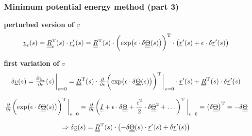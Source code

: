 \begin{frame}
  \frametitle{Minimum potential energy method (part 3)}
  
  \textbf{perturbed version of $\underline{v}$}
  \begin{displaymath}
    \underline{v}_{\epsilon}(s) =
    \underline{\underline{R}}_{\epsilon}^{\mathrm{T}}(s) \cdot \underline{r}_{\epsilon}^{\prime}(s) =
    \underline{\underline{R}}^{\mathrm{T}}(s) \cdot \biggl( \exp \bigl( \epsilon \cdot \delta \underline{\underline{\Theta}}(s) \bigr) \biggr)^{\mathrm{T}} \cdot \bigl( \underline{r}^{\prime}(s) + \epsilon \cdot \delta \underline{r}^{\prime}(s) \bigr)
  \end{displaymath}
  
  \vspace{0.5em}
  \textbf{first variation of $\underline{v}$}
  \begin{displaymath}
    \delta \underline{v}(s) = 
    \pd{\underline{v}_{\epsilon}}{\epsilon}(s) \sVert[3]_{\epsilon=0} =
    \doubleunderline{R}^{\mathrm{T}}(s) \cdot
    \pd{}{\epsilon} \biggl( \exp \bigl( \epsilon \cdot \delta \doubleunderline{\Theta}(s) \bigr) \biggr)^{\mathrm{T}} \sVert[3]_{\epsilon=0}
     \cdot \underline{r}^{\prime}(s) +
     \doubleunderline{R}^{\mathrm{T}}(s) \cdot \delta \underline{r}^{\prime}(s)
  \end{displaymath}
  
  \vspace{0.5em}
  \begin{displaymath}
    \pd{}{\epsilon} \biggl( \exp \bigl( \epsilon \cdot \delta \doubleunderline{\Theta}(s) \bigr) \biggr)^{\mathrm{T}} \sVert[3]_{\epsilon=0} =
    \pd{}{\epsilon} \biggl( \doubleunderline{I} + \epsilon \cdot \delta \doubleunderline{\Theta} + \frac{\epsilon^2}{2} \cdot \delta \doubleunderline{\Theta}^2 + \dots \biggr)^{\mathrm{T}} \sVert[3]_{\epsilon=0} =
    \bigl( \delta \doubleunderline{\Theta} \bigr)^{\mathrm{T}} = -\delta \doubleunderline{\Theta} 
  \end{displaymath}
  
  \vspace{0.5em}
  \begin{displaymath}
    \Rightarrow
    \delta \underline{v}(s) =
    \underline{\underline{R}}^{\mathrm{T}}(s) \cdot
    \bigl( - \delta \underline{\underline{\Theta}}(s) \cdot \underline{r}^{\prime}(s) + \delta \underline{r}^{\prime}(s) \bigr)
  \end{displaymath}
\end{frame}



